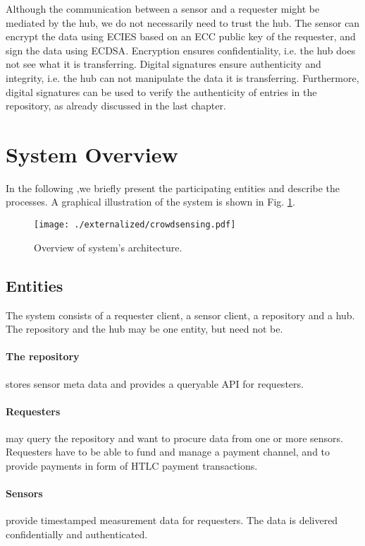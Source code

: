 Although the communication between a sensor and a requester might be mediated by the hub, we do not necessarily need to trust the hub. The sensor can encrypt the data using \ac{ECIES} based on an \ac{ECC} public key of the requester, and sign the data using \ac{ECDSA}. Encryption ensures confidentiality, i.e. the hub does not see what it is transferring. Digital signatures ensure authenticity and integrity, i.e. the hub can not manipulate the data it is transferring. 
Furthermore, digital signatures can be used to verify the authenticity of entries in the repository, as already discussed in the last chapter.

\section{System Overview}
\label{sec:trust-lessoverview}

In the following ,we briefly present the participating entities and describe the processes. A graphical illustration of the system is shown in Fig. \ref{fig:architecture}.

 \begin{figure}
 \texttt{[image: ./externalized/crowdsensing.pdf]}
 \caption{Overview of system's architecture.}
 \label{fig:architecture}
 \end{figure}

\subsection{Entities}

The system consists of a requester client, a sensor client, a repository and a hub. The repository and the hub may be one entity, but need not be. 

\paragraph{The repository} stores sensor meta data and provides a queryable \ac{API} for requesters.

\paragraph{Requesters} may query the repository and want to procure data from one or more sensors. Requesters have to be able to fund and manage a payment channel, and to provide payments in form of \ac{HTLC} payment transactions.

\paragraph{Sensors} provide timestamped measurement data for requesters. The data is delivered confidentially and authenticated.

